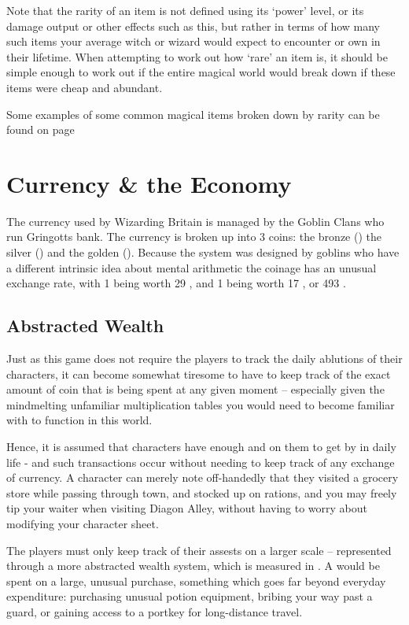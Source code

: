 Note that the rarity of an item is not defined using its `power' level, or its damage output or other effects such as this, but rather in terms of how many such items your average witch or wizard would expect to encounter or own in their lifetime. When attempting to work out how `rare' an item is, it should be simple enough to work out if the entire magical world would break down if these items were cheap and abundant. 

Some examples of some common magical items broken down by rarity can be found on page \pageref{E:EnchantingExamples}


\chapter{Currency \& the Economy}

The currency used by Wizarding Britain is managed by the Goblin Clans who run Gringotts bank. The currency is broken up into 3 coins: the bronze  (\knut{})\comma{} the silver  (\sickle{}) and the golden  (\galleon{}). Because the system was designed by goblins \minus{} who have a different intrinsic idea about mental arithmetic \minus{} the coinage has an unusual exchange rate, with 1  being worth 29 , and 1  being worth 17 , or 493 . 


\section{Abstracted Wealth}

Just as this game does not require the players to track the daily ablutions of their characters, it can become somewhat tiresome to have to keep track of the exact amount of coin that is being spent at any given moment -- especially given the mindmelting unfamiliar multiplication tables you would need to become familiar with to function in this world. 

Hence, it is assumed that characters have enough  and  on them to get by in daily life - and such transactions occur without needing to keep track of any exchange of currency. A character can merely note off-handedly that they visited a grocery store while passing through town, and stocked up on rations, and you may freely tip your waiter when visiting Diagon Alley, without having to worry about modifying your character sheet.

The players must only keep track of their assests on a larger scale -- represented through a more abstracted wealth system, which is measured in . A  would be spent on a large, unusual purchase, something which goes far beyond everyday expenditure: purchasing unusual potion equipment, bribing your way past a guard, or gaining access to a portkey for long-distance travel. 

